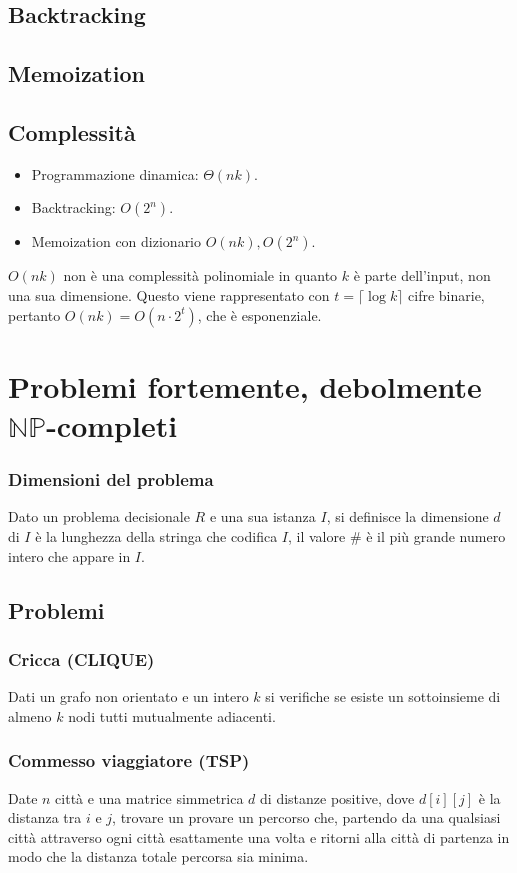 \subsection{Backtracking}

\subsection{Memoization}

\subsection{Complessit\`a}
\begin{itemize}
	\item Programmazione dinamica: $\Theta(nk)$.
	\item Backtracking: $O(2^n)$.
	\item Memoization con dizionario $O(nk), O(2^n)$.
\end{itemize}
$O(nk)$ non \`e una complessit\`a polinomiale in quanto $k$ \`e parte dell'input, non una sua dimensione. Questo viene rappresentato con $t = \lceil\log k\rceil$ cifre binarie, pertanto
$O(nk) = O(n\cdot 2^t)$, che \`e esponenziale.
\section{Problemi fortemente, debolmente $\mathbf{\mathbb{NP}}$-completi}
\subsubsection{Dimensioni del problema}
Dato un problema decisionale $R$ e una sua istanza $I$, si definisce la dimensione $d$ di $I$ \`e la lunghezza della stringa che codifica $I$, il valore $\#$ \`e il pi\`u grande numero 
intero che appare in $I$.
\subsection{Problemi}
\subsubsection{Cricca (CLIQUE)}
Dati un grafo non orientato e un intero $k$ si verifiche se esiste un sottoinsieme di almeno $k$ nodi tutti mutualmente adiacenti.
\subsubsection{Commesso viaggiatore (TSP)}
Date $n$ citt\`a e una matrice simmetrica $d$ di distanze positive, dove $d[i][j]$ \`e la distanza tra $i$ e $j$, trovare un provare un percorso che, partendo da una qualsiasi citt\`a
attraverso ogni citt\`a esattamente una volta e ritorni alla citt\`a di partenza in modo che la distanza totale percorsa sia minima.
